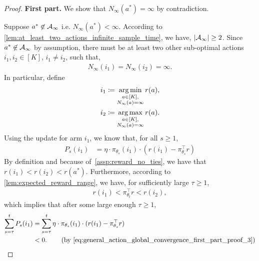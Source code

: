 \begin{proof}
\textbf{First part.} We show that $N_\infty(a^*) = \infty$ by contradiction.

Suppose $a^* \not\in {\mathcal{A}}_\infty$ i.e. $N_\infty(a^*) < \infty$. According to \cref{lem:at_least_two_actions_infinite_sample_time}, we have, $| {\mathcal{A}}_\infty | \ge 2$. Since $a^* \not\in {\mathcal{A}}_\infty$ by assumption, there must be at least two other sub-optimal actions $i_1, i_2 \in [K]$, $i_1 \ne i_2$, such that,
\begin{align}
\label{eq:general_action_global_convergence_first_part_proof_1}
    N_\infty(i_1) = N_\infty(i_2) = \infty.
\end{align}
In particular, define
\begin{align}
\label{eq:general_action_global_convergence_first_part_proof_2}
    i_1 &\coloneqq \operatorname*{arg\,min}_{\substack{a \in [K], \\ N_\infty(a) = \infty}} r(a), \\
    i_2 &\coloneqq \operatorname*{arg\,max}_{\substack{a \in [K], \\ N_\infty(a) = \infty}} r(a).
\end{align}
Using the update for arm $i_1$, we know that, for all $s \geq 1$, 
\begin{align}
P_s(i_1) &= \eta \cdot \pi_{\theta_s}(i_1) \cdot ( r(i_1) - \pi_{\theta_s}^\top r ) 
\end{align}
By definition and because of~\cref{assp:reward_no_ties}, we have that $r(i_1) < r(i_2) < r(a^*)$. Furthermore, according to \cref{lem:expected_reward_range}, we have, for sufficiently large $\tau \ge 1$,
\begin{align}
\label{eq:general_action_global_convergence_first_part_proof_3}
    r(i_1) < \pi_{\theta_t}^\top r < r(i_2),
\end{align}
which implies that after some large enough $\tau \ge 1$,
\begin{align}
    \sum_{s=\tau}^t P_s(i_1) &= \sum_{s=\tau}^t \eta \cdot \pi_{\theta_s}(i_1) \cdot ( r(i_1) - \pi_{\theta_s}^\top r ) \\
    & < 0. \qquad \left(\text{by \cref{eq:general_action_global_convergence_first_part_proof_3}}\right) \label{eq:general_action_global_convergence_first_part_proof_4}
\end{align}


\end{proof}
